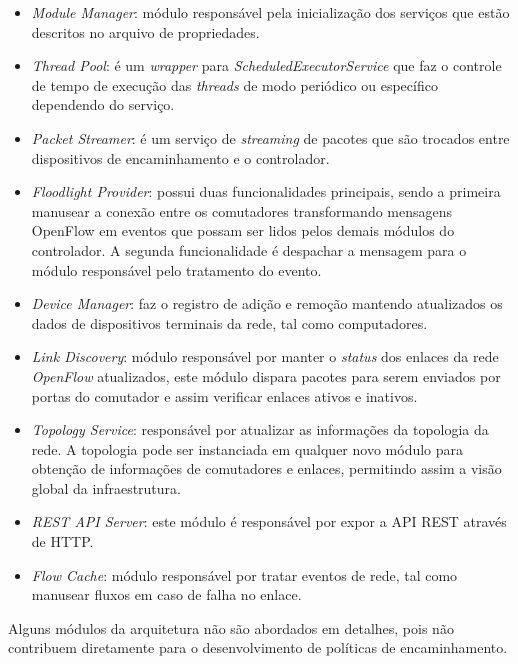 \begin{itemize}
\item \textit{Module Manager}: módulo responsável pela inicialização dos serviços que estão descritos no arquivo de propriedades.
\item \textit{Thread Pool}: é um \textit{wrapper} para \textit{ScheduledExecutorService} que faz o controle de tempo de execução das \textit{threads} de modo periódico ou específico dependendo do serviço.
\item \textit{Packet Streamer}: é um serviço de \textit{streaming} de pacotes que são trocados entre dispositivos de encaminhamento e o controlador.
\item \textit{Floodlight Provider}: possui duas funcionalidades principais, sendo a primeira manusear a conexão entre os comutadores transformando mensagens OpenFlow em eventos que possam ser lidos pelos demais módulos do controlador. A segunda funcionalidade é despachar a mensagem para o módulo responsável pelo tratamento do evento. 
\item \textit{Device Manager}: faz o registro de adição e remoção mantendo atualizados os dados de dispositivos terminais da rede, tal como computadores.
\item \textit{Link Discovery}: módulo responsável por manter o \textit{status} dos enlaces da rede \textit{OpenFlow} atualizados, este módulo dispara pacotes para serem enviados por portas do comutador e assim verificar enlaces ativos e inativos.
\item \textit{Topology Service}: responsável por atualizar as informações da topologia da rede. A topologia pode ser instanciada em qualquer novo módulo para obtenção de informações de comutadores e enlaces, permitindo assim a visão global da infraestrutura.
\item \textit{REST API Server}: este módulo é responsável por expor a API REST através de HTTP. 
\item \textit{Flow Cache}: módulo responsável por tratar eventos de rede, tal como manusear fluxos em caso de falha no enlace.
\end{itemize}

Alguns módulos da arquitetura não são abordados em detalhes, pois não contribuem diretamente para o desenvolvimento de políticas de encaminhamento. 






